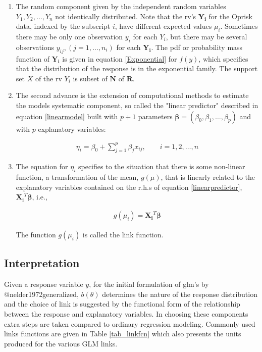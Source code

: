 \documentclass[]{article}
\begin{document}
\begin{enumerate}
\item The random component given by the independent random variables $Y_1, Y_2, \ldots, Y_n $ not identically distributed. Note that the rv's $\mathbf{Y_i}$ for the Oprisk data, indexed by the subscript $i$, have different expected values $\mu_i$. Sometimes there may be only one observation $y_i$ for each $Y_i$, but there may be several observations $y_{ij}, (j=1,\ldots,n_i)$ for each $\mathbf{Y_i}$. The pdf or probability mass function of $\mathbf{Y_i}$ is given in equation \ref{Exponential} for $f(y)$, which specifies that the distribution of the response is in the exponential family. The support set $X$ of the rv $Y_i$ is subset of $\mathbf{N}$ of $\mathbf{R}$. 

\item The second advance is the extension of computational methods to estimate the models systematic component, so called the "linear predictor" described in equation \ref{linearmodel} built with $p+1$ parameters $\mathbf{\beta} = (\beta_0,\beta_1,\ldots,\beta_p)$ and with $p$ explanatory variables:

\singlespacing
\begin{eqnarray}\label{linearpredictor}
\eta_i = \beta_0 + \sum_{j=1}^{p}\beta_jx_{ij}, \qquad i = 1,2,\ldots,n
\end{eqnarray}
\doublespacing

\item The equation for $\eta_i$ specifies to the situation that there is some non-linear function, a transformation of the mean, $g(\mu)$, that is linearly related to the explanatory variables contained on the r.h.s of equation \ref{linearpredictor}, $\mathbf{X_i}^T\mathbf{\beta}$, i.e.,

\singlespacing
\begin{eqnarray}
g(\mu_i) = \mathbf{X_i}^T\mathbf{\beta}
\end{eqnarray}
\doublespacing

The function $g(\mu_i)$ is called the link function.
\end{enumerate}

\subsection{Interpretation}

Given a response variable \(y\), for the initial formulation of glm's by
@nelder1972generalized, \(b(\theta)\) determines the nature of the
response distribution and the choice of link is suggested by the
functional form of the relationship between the response and explanatory
variables. In choosing these components extra steps are taken compared
to ordinary regression modeling. Commonly used links functions are given
in Table \ref{tab_linkfcn} which also presents the units produced for
the various GLM links.
\end{document}
